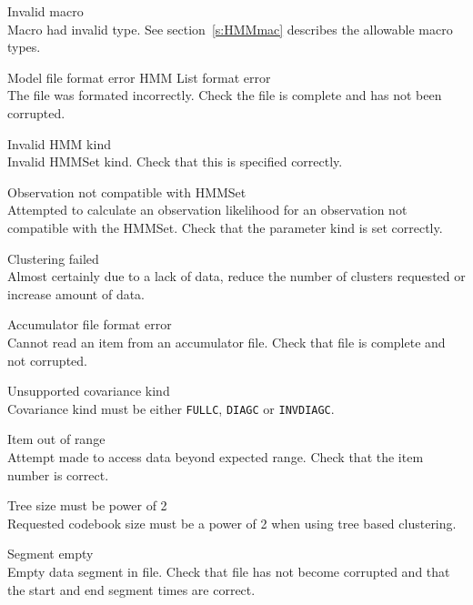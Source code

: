 \begin{itemize}
\begin{itemize}
    Invalid macro\\
        Macro had invalid type.  See section~\ref{s:HMMmac} describes the 
        allowable macro types.

    Model file format error
    HMM List format error\\
        The file was formated incorrectly.  Check the file is complete and
        has not been corrupted.

    Invalid HMM kind\\
        Invalid HMMSet kind.  Check that this is specified correctly.

    Observation not compatible with HMMSet\\
        Attempted to calculate an observation likelihood for an observation
        not compatible with the HMMSet.  Check that the parameter kind is
        set correctly.

\end{itemize}


\begin{itemize}
    Clustering failed\\
        Almost certainly due to a lack of data, reduce the
        number of clusters requested  or increase amount of data.

    Accumulator file format error\\
        Cannot read an item from an accumulator file. Check
        that file is complete and not corrupted.

    Unsupported covariance kind\\
        Covariance kind must be either \texttt{FULLC}, \texttt{DIAGC} or 
        \texttt{INVDIAGC}.

    Item out of range\\
        Attempt made to access data beyond expected range. Check that 
        the item number is correct.

    Tree size must be power of 2\\
        Requested codebook size must be a power of 2 when
        using tree based clustering.

    Segment empty\\
        Empty data segment in file. Check that file has not
        become corrupted and that the start and end segment times
        are correct.


\end{itemize}
\end{itemize}
